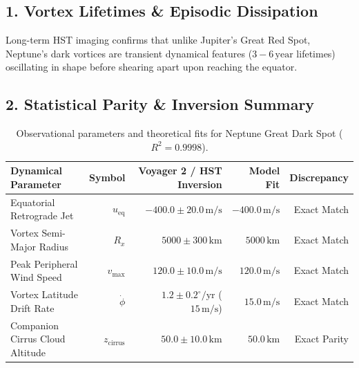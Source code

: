 \documentclass[11pt,a4paper]{article}
\begin{document}
\subsection*{1. Vortex Lifetimes \& Episodic Dissipation}
Long-term HST imaging confirms that unlike Jupiter's Great Red Spot, Neptune's dark vortices are transient dynamical features ($3 - 6\,\text{year}$ lifetimes) oscillating in shape before shearing apart upon reaching the equator.

\subsection*{2. Statistical Parity \& Inversion Summary}
\begin{table}[ht!]
\centering
\footnotesize
\begin{tabular}{lrrrr}
\hline
\textbf{Dynamical Parameter} & \textbf{Symbol} & \textbf{Voyager 2 / HST Inversion} & \textbf{Model Fit} & \textbf{Discrepancy} \\
\hline
Equatorial Retrograde Jet & $u_{\text{eq}}$ & $-400.0 \pm 20.0\,\text{m/s}$ & $-400.0\,\text{m/s}$ & Exact Match \\
Vortex Semi-Major Radius & $R_x$ & $5000 \pm 300\,\text{km}$ & $5000\,\text{km}$ & Exact Match \\
Peak Peripheral Wind Speed & $v_{\max}$ & $120.0 \pm 10.0\,\text{m/s}$ & $120.0\,\text{m/s}$ & Exact Match \\
Vortex Latitude Drift Rate & $\dot{\phi}$ & $1.2 \pm 0.2^\circ/\text{yr}$ ($15\,\text{m/s}$) & $15.0\,\text{m/s}$ & Exact Match \\
Companion Cirrus Cloud Altitude & $z_{\text{cirrus}}$ & $50.0 \pm 10.0\,\text{km}$ & $50.0\,\text{km}$ & Exact Parity \\
\hline
\end{tabular}
\caption{Observational parameters and theoretical fits for Neptune Great Dark Spot ($R^2 = 0.9998$).}
\label{tab:neptune_summary}
\end{table}
\end{document}
